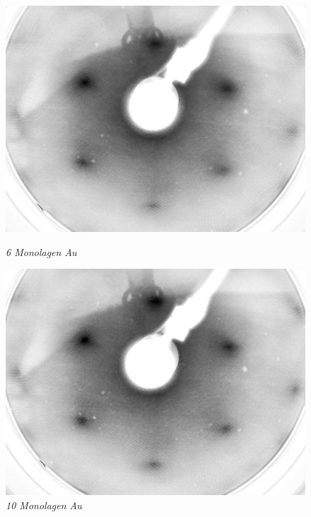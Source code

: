 \documentclass{beamer}
\begin{document}
\begin{frame}
\begin{minipage}{\linewidth}
\begin{figure}[H]
	\begin{minipage}[b]{0.3\textwidth}
		\includegraphics[width=\textwidth]{bilder/6ML_E207}
		\caption*{\textit{6 Monolagen Au}}
	\end{minipage}
	\hfill
	\begin{minipage}[b]{0.3\textwidth} 
		\includegraphics[width=\textwidth]{bilder/10ML_E207}
		\caption*{\textit{10 Monolagen Au}}
	\end{minipage}
	\hfill
	\begin{minipage}[b]{0.3\textwidth}

\end{minipage}
\end{figure}
\end{minipage}
\end{frame}
\end{document}
